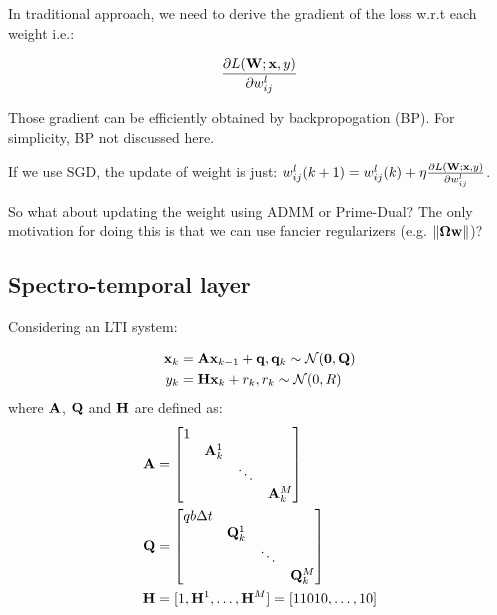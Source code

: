 \documentclass[11pt,a4paper]{article}
\begin{document}
In traditional approach, we need to derive the gradient of the loss w.r.t each weight i.e.:

\begin{equation}
\frac{\partial L(\mathbf{W}; \mathbf{x}, y)}{\partial w^l_{ij}}
\end{equation}

Those gradient can be efficiently obtained by backpropogation (BP). For simplicity, BP not discussed here. 

If we use SGD, the update of weight is just: $w^l_{ij}(k+1) = w^l_{ij}(k) + \eta \frac{\partial L(\mathbf{W}; \mathbf{x}, y)}{\partial w^l_{ij}}$.

So what about updating the weight using ADMM or Prime-Dual? The only motivation for doing this is that we can use fancier regularizers (e.g. $\lVert\bm{\Omega} \mathbf{w}\rVert$)?

\subsection{Spectro-temporal layer}

Considering an LTI system:

\begin{equation}
\begin{split}
\cu{x}_k & = \cu{A}\cu{x}_{k-1} + \cu{q}, \hfill \cu{q}_k\sim\mathcal{N}(\cu{0},\cu{Q})\\
y_k &= \cu{H}\cu{x}_k + r_k, \hfill r_k\sim\mathcal{N}(0, R)
\end{split}
\label{equ:osc-model}
\end{equation}
where $\mathbf{A}$, $\mathbf{Q}$ and $\mathbf{H}$ are defined as:
\begin{align}
\mathbf{A} &= \begin{bmatrix}
1 & & &\\
& \mathbf{A}^1_k & &\\
& & \ddots &\\
& & & \mathbf{A}^M_k
\end{bmatrix}\\
\mathbf{Q} &= \begin{bmatrix}
qb \Delta t & & &\\
& \mathbf{Q}^1_k & & \\
& & \ddots & \\
& & & \mathbf{Q}^M_k
\end{bmatrix}\\
\mathbf{H} &= [1, \mathbf{H}^1, \ldots, \mathbf{H}^M] = [1 1 0 1 0, \ldots, 1 0]
\label{equ:osc-a-q-h}
\end{align}  
\end{document}
